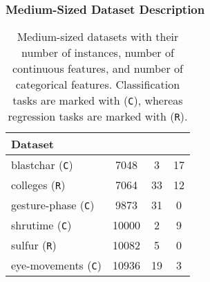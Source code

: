 \documentclass{article}
\theoremstyle{plain}
\theoremstyle{definition}
\theoremstyle{remark}
\begin{document}
\subsubsection{Medium-Sized Dataset Description}

\begin{table}[ht]
    \caption{Medium-sized datasets with their number of instances, number
    of continuous features, and number of categorical features. Classification tasks are marked with (\texttt{C}), whereas regression tasks are marked with (\texttt{R}).\label{tab:medium-sized datasets}}
    \begin{center}
        \begin{tabular}{lS[table-format=5.0]S[table-format=2.0]S[table-format=2.0]}
               {\bf Dataset} & {} & {} & {}\\
               \toprule
             blastchar (\texttt{C}) & 7048 & 3 & 17 \\
             colleges (\texttt{R}) & 7064 & 33 & 12 \\
             gesture-phase (\texttt{C}) & 9873 & 31 & 0 \\
             shrutime (\texttt{C}) & 10000 & 2 & 9 \\
             sulfur (\texttt{R}) & 10082 & 5 & 0 \\
             eye-movements (\texttt{C}) & 10936 & 19 & 3
        \end{tabular}
    \end{center}
\end{table}
\end{document}
